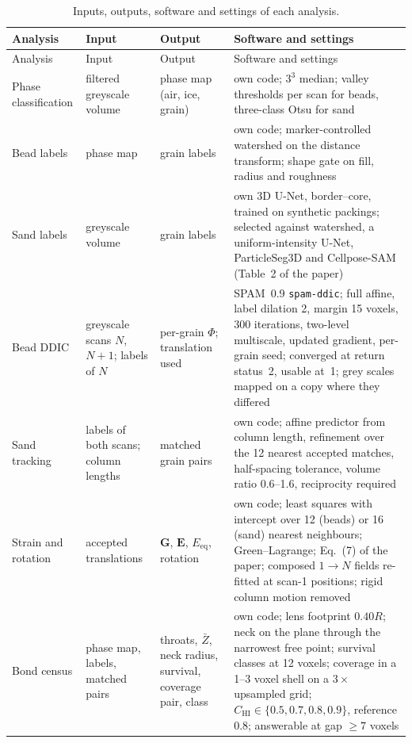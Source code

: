   {\footnotesize
   \setlength{\tabcolsep}{4pt}
   \renewcommand{\arraystretch}{1.15}
   \begin{longtable}{p{2.4cm}p{2.6cm}p{2.4cm}>{\raggedright\arraybackslash}p{5.6cm}}
      \caption{Inputs, outputs, software and settings of each analysis.}
      \label{tab:settings} \\
      \toprule
      Analysis & Input & Output & Software and settings \\
      \midrule
      \endfirsthead
      \toprule
      Analysis & Input & Output & Software and settings \\
      \midrule
      \endhead
      Phase classification & filtered greyscale volume & phase map (air, ice, grain) & own code; $3^3$ median; valley thresholds per scan for beads, three-class Otsu for sand \\
      Bead labels & phase map & grain labels & own code; marker-controlled watershed on the distance transform; shape gate on fill, radius and roughness \\
      Sand labels & greyscale volume & grain labels & own 3D U-Net, border--core, trained on synthetic packings; selected against watershed, a uniform-intensity U-Net, ParticleSeg3D and Cellpose-SAM (Table~2 of the paper) \\
      Bead DDIC & greyscale scans $N$, $N{+}1$; labels of $N$ & per-grain $\Phi$; translation used & SPAM~0.9 \texttt{spam-ddic}; full affine, label dilation 2, margin 15 voxels, 300 iterations, two-level multiscale, updated gradient, per-grain seed; converged at return status~2, usable at~1; grey scales mapped on a copy where they differed \\
      Sand tracking & labels of both scans; column lengths & matched grain pairs & own code; affine predictor from column length, refinement over the 12 nearest accepted matches, half-spacing tolerance, volume ratio 0.6--1.6, reciprocity required \\
      Strain and rotation & accepted translations & $\mathbf{G}$, $\mathbf{E}$, $E_\mathrm{eq}$, rotation & own code; least squares with intercept over 12 (beads) or 16 (sand) nearest neighbours; Green--Lagrange; Eq.~(7) of the paper; composed $1\!\to\!N$ fields re-fitted at scan-1 positions; rigid column motion removed \\
      Bond census & phase map, labels, matched pairs & throats, $\bar Z$, neck radius, survival, coverage pair, class & own code; lens footprint $0.40R$; neck on the plane through the narrowest free point; survival classes at 12 voxels; coverage in a 1--3 voxel shell on a $3\times$ upsampled grid; $C_\mathrm{HI} \in \{0.5,0.7,0.8,0.9\}$, reference 0.8; answerable at gap $\geq 7$ voxels \\

\end{longtable}}
